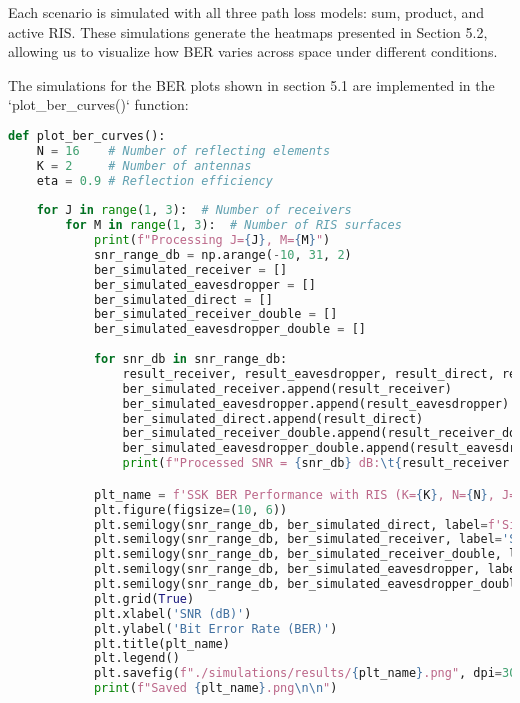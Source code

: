 Each scenario is simulated with all three path loss models: sum, product, and active RIS. These simulations generate the heatmaps presented in Section 5.2, allowing us to visualize how BER varies across space under different conditions.

The simulations for the BER plots shown in section 5.1 are implemented in the `plot\_ber\_curves()` function:

\begin{lstlisting}[language=python, caption={BER Curve Plotting Function}]
def plot_ber_curves():
    N = 16    # Number of reflecting elements
    K = 2     # Number of antennas 
    eta = 0.9 # Reflection efficiency
    
    for J in range(1, 3):  # Number of receivers
        for M in range(1, 3):  # Number of RIS surfaces
            print(f"Processing J={J}, M={M}")
            snr_range_db = np.arange(-10, 31, 2)
            ber_simulated_receiver = []
            ber_simulated_eavesdropper = []
            ber_simulated_direct = []
            ber_simulated_receiver_double = []
            ber_simulated_eavesdropper_double = []
            
            for snr_db in snr_range_db:
                result_receiver, result_eavesdropper, result_direct, result_receiver_double, result_eavesdropper_double = calculate_ber_simulation(snr_db, K, N, J, M, eta)
                ber_simulated_receiver.append(result_receiver)
                ber_simulated_eavesdropper.append(result_eavesdropper)
                ber_simulated_direct.append(result_direct)
                ber_simulated_receiver_double.append(result_receiver_double)
                ber_simulated_eavesdropper_double.append(result_eavesdropper_double)
                print(f"Processed SNR = {snr_db} dB:\t{result_receiver:.2f}\t{result_eavesdropper:.2f}\t{result_direct:.2f}")

            plt_name = f'SSK BER Performance with RIS (K={K}, N={N}, J={J}, M={M})'
            plt.figure(figsize=(10, 6))
            plt.semilogy(snr_range_db, ber_simulated_direct, label=f'Simulation Direct')
            plt.semilogy(snr_range_db, ber_simulated_receiver, label='Simulation Receiver')
            plt.semilogy(snr_range_db, ber_simulated_receiver_double, label='Simulation Receiver Double RIS Source')
            plt.semilogy(snr_range_db, ber_simulated_eavesdropper, label=f'Simulation Eavesdropper')
            plt.semilogy(snr_range_db, ber_simulated_eavesdropper_double, label=f'Simulation Eavesdropper Double RIS Source')
            plt.grid(True)
            plt.xlabel('SNR (dB)')
            plt.ylabel('Bit Error Rate (BER)')
            plt.title(plt_name)
            plt.legend()
            plt.savefig(f"./simulations/results/{plt_name}.png", dpi=300, format='png')
            print(f"Saved {plt_name}.png\n\n")
\end{lstlisting}

